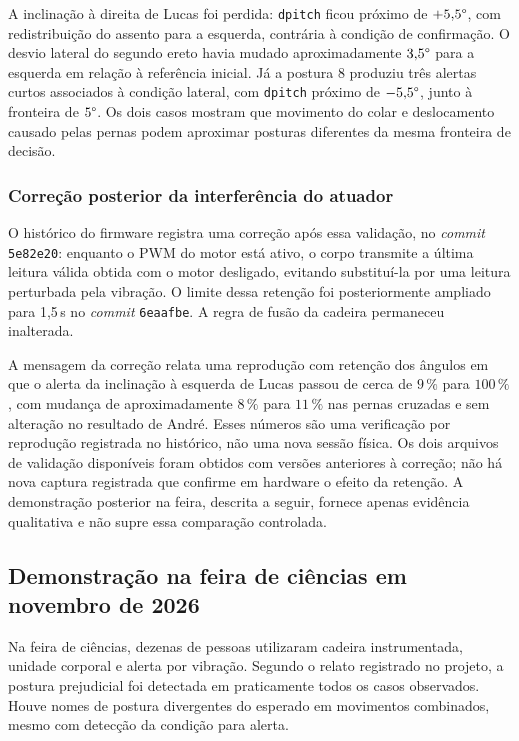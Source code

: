 A inclinação à direita de Lucas foi perdida: \texttt{dpitch} ficou próximo
de $+5{,}5\degree{}$, com redistribuição do assento para a esquerda,
contrária à condição de confirmação. O desvio lateral do segundo ereto
havia mudado aproximadamente $3{,}5\degree{}$ para a esquerda em relação
à referência inicial. Já a postura 8 produziu três alertas curtos associados
à condição lateral, com \texttt{dpitch} próximo de $-5{,}5\degree{}$, junto
à fronteira de $5\degree{}$. Os dois casos mostram que movimento do colar
e deslocamento causado pelas pernas podem aproximar posturas diferentes da
mesma fronteira de decisão.

\subsubsection{Correção posterior da interferência do atuador}

O histórico do firmware registra uma correção após essa validação, no
\textit{commit} \texttt{5e82e20}: enquanto o PWM do motor está ativo, o corpo
transmite a última leitura válida obtida com o motor desligado, evitando
substituí-la por uma leitura perturbada pela vibração. O limite dessa
retenção foi posteriormente ampliado para 1{,}5\,s no
\textit{commit} \texttt{6eaafbe}. A regra de fusão da cadeira permaneceu
inalterada.

A mensagem da correção relata uma reprodução com retenção dos ângulos em que
o alerta da inclinação à esquerda de Lucas passou de cerca de $9\,\%$ para
$100\,\%$, com mudança de aproximadamente $8\,\%$ para $11\,\%$ nas
pernas cruzadas e sem alteração no resultado de André. Esses números são
uma verificação por reprodução registrada no histórico, não uma nova sessão
física. Os dois arquivos de validação disponíveis foram obtidos com versões
anteriores à correção; não há nova captura registrada que confirme em hardware
o efeito da retenção. A demonstração posterior na feira, descrita a seguir,
fornece apenas evidência qualitativa e não supre essa comparação controlada.

\subsection{Demonstração na feira de ciências em novembro de 2026}
\label{sec:res-feira}

Na feira de ciências, dezenas de pessoas utilizaram cadeira instrumentada,
unidade corporal e alerta por vibração. Segundo o relato registrado no
projeto, a postura prejudicial foi detectada em praticamente todos os casos
observados. Houve nomes de postura divergentes do esperado em movimentos
combinados, mesmo com detecção da condição para alerta.

